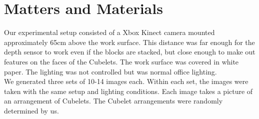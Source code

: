 \documentclass[conference]{IEEEtran}
\begin{document}
%


%



\section{Matters and Materials}
Our experimental setup consisted of a Xbox Kinect camera mounted approximately 65cm above the work surface. This distance was far enough for the depth sensor to work even if the blocks are stacked, but close enough to make out features on the faces of the Cubelets. The work surface was covered in white paper. The lighting was not controlled but was normal office lighting.\\

We generated three sets of 10-14 images each. Within each set, the images were taken with the same setup and lighting conditions. Each image takes a picture of an arrangement of Cubelets. The Cubelet arrangements were randomly determined by us.\\
\end{document}
